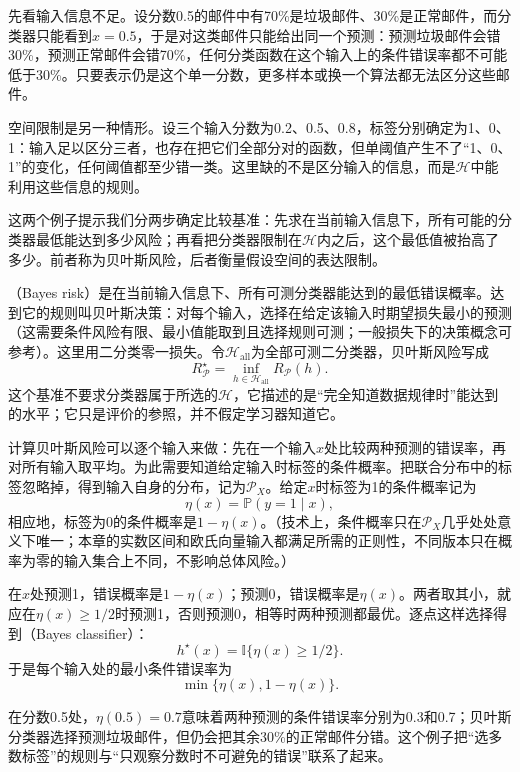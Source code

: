 先看输入信息不足。设分数0.5的邮件中有70\%是垃圾邮件、30\%是正常邮件，而分类器只能看到$x=0.5$，于是对这类邮件只能给出同一个预测：预测垃圾邮件会错30\%，预测正常邮件会错70\%，任何分类函数在这个输入上的条件错误率都不可能低于30\%。只要表示仍是这个单一分数，更多样本或换一个算法都无法区分这些邮件。

空间限制是另一种情形。设三个输入分数为0.2、0.5、0.8，标签分别确定为1、0、1：输入足以区分三者，也存在把它们全部分对的函数，但单阈值产生不了“1、0、1”的变化，任何阈值都至少错一类。这里缺的不是区分输入的信息，而是$\mathcal H$中能利用这些信息的规则。

这两个例子提示我们分两步确定比较基准：先求在当前输入信息下，所有可能的分类器最低能达到多少风险；再看把分类器限制在$\mathcal H$内之后，这个最低值被抬高了多少。前者称为贝叶斯风险，后者衡量假设空间的表达限制。

（Bayes risk）是在当前输入信息下、所有可测分类器能达到的最低错误概率。达到它的规则叫贝叶斯决策：对每个输入，选择在给定该输入时期望损失最小的预测（这需要条件风险有限、最小值能取到且选择规则可测；一般损失下的决策概念可参考）。这里用二分类零一损失。令$\mathcal H_{\mathrm{all}}$为全部可测二分类器，贝叶斯风险写成
\begin{equation}
 R_{\mathcal P}^\star=\inf_{h\in\mathcal H_{\mathrm{all}}}R_{\mathcal P}(h).
 \label{eq:bayes-risk}
\end{equation}
这个基准不要求分类器属于所选的$\mathcal H$，它描述的是“完全知道数据规律时”能达到的水平；它只是评价的参照，并不假定学习器知道它。

计算贝叶斯风险可以逐个输入来做：先在一个输入$x$处比较两种预测的错误率，再对所有输入取平均。为此需要知道给定输入时标签的条件概率。把联合分布中的标签忽略掉，得到输入自身的分布，记为$\mathcal P_X$。给定$x$时标签为1的条件概率记为
\[
 \eta(x)=\mathbb P(y=1\mid x),
\]
相应地，标签为0的条件概率是$1-\eta(x)$。（技术上，条件概率只在$\mathcal P_X$几乎处处意义下唯一；本章的实数区间和欧氏向量输入都满足所需的正则性，不同版本只在概率为零的输入集合上不同，不影响总体风险。）

在$x$处预测1，错误概率是$1-\eta(x)$；预测0，错误概率是$\eta(x)$。两者取其小，就应在$\eta(x)\geq1/2$时预测1，否则预测0，相等时两种预测都最优。逐点这样选择得到（Bayes classifier）：
\[
 h^\star(x)=\mathbb I\{\eta(x)\geq1/2\}.
\]
于是每个输入处的最小条件错误率为
\[
 \min\{\eta(x),1-\eta(x)\}.
\]

在分数0.5处，$\eta(0.5)=0.7$意味着两种预测的条件错误率分别为0.3和0.7；贝叶斯分类器选择预测垃圾邮件，但仍会把其余30\%的正常邮件分错。这个例子把“选多数标签”的规则与“只观察分数时不可避免的错误”联系了起来。

